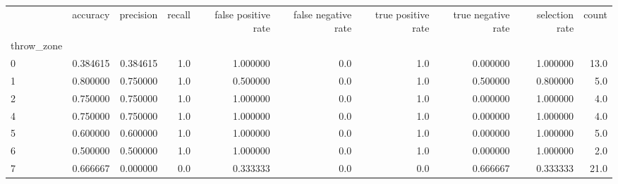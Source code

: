 \begin{tabular}{lrrrrrrrrr}
\toprule
{} &  accuracy &  precision &  recall &  false positive rate &  false negative rate &  true positive rate &  true negative rate &  selection rate &  count \\
throw\_zone &           &            &         &                      &                      &                     &                     &                 &        \\
\midrule
0          &  0.384615 &   0.384615 &     1.0 &             1.000000 &                  0.0 &                 1.0 &            0.000000 &        1.000000 &   13.0 \\
1          &  0.800000 &   0.750000 &     1.0 &             0.500000 &                  0.0 &                 1.0 &            0.500000 &        0.800000 &    5.0 \\
2          &  0.750000 &   0.750000 &     1.0 &             1.000000 &                  0.0 &                 1.0 &            0.000000 &        1.000000 &    4.0 \\
4          &  0.750000 &   0.750000 &     1.0 &             1.000000 &                  0.0 &                 1.0 &            0.000000 &        1.000000 &    4.0 \\
5          &  0.600000 &   0.600000 &     1.0 &             1.000000 &                  0.0 &                 1.0 &            0.000000 &        1.000000 &    5.0 \\
6          &  0.500000 &   0.500000 &     1.0 &             1.000000 &                  0.0 &                 1.0 &            0.000000 &        1.000000 &    2.0 \\
7          &  0.666667 &   0.000000 &     0.0 &             0.333333 &                  0.0 &                 0.0 &            0.666667 &        0.333333 &   21.0 \\
\bottomrule
\end{tabular}
